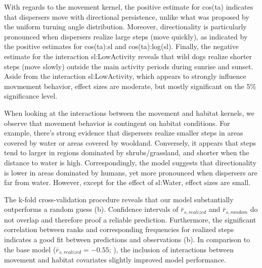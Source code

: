 \documentclass[abstract=on,10pt,a4paper,bibliography=totocnumbered]{article}
\begin{document}
With regards to the movement kernel, the positive estimate for \textsf{cos(ta)}
indicates that dispersers move with directional persistence, unlike what was
proposed by the uniform turning angle distribution. Moreover, directionality is
particularly pronounced when dispersers realize large steps (move quickly), as
indicated by the positive estimates for \textsf{cos(ta):sl} and
\textsf{cos(ta):log(sl)}. Finally, the negative estimate for the interaction
\textsf{sl:LowActivity} reveals that wild dogs realize shorter steps (move
slowly) outside the main activity periods during sunrise and sunset. Aside from
the interaction \textsf{sl:LowActivity}, which appears to strongly influence
movmement behavior, effect sizes are moderate, but mostly significant on the 5\%
significance level.

When looking at the interactions between the movement and habitat kernels, we
observe that movement behavior is contingent on habitat conditions. For example,
there's strong evidence that dispersers realize smaller steps in areas covered
by water or areas covered by wooldand. Conversely, it appears that steps tend to
larger in regions dominated by shrubs/grassland, and shorter when the distance
to water is high. Correspondingly, the model suggests that directionality is
lower in areas dominated by humans, yet more pronounced when dispersers are far
from water. However, except for the effect of \textsf{sl:Water}, effect sizes
are small.

The k-fold cross-validation procedure reveals that our model substantially
outperforms a random guess (b). Confidence intervals of
\(\bar{r}_{s, realized}\) and \(\bar{r}_{s, random}\) do not overlap and
therefore proof a reliable prediction. Furthermore, the significant correlation
between ranks and corresponding frequencies for realized steps indicates a good
fit between predictions and observations (b). In comparison
to the base model (\(\bar{r}_{s, realized} = -0.55\); \citealp{Hofmann.2021}),
the inclusion of interactions between movement and habitat covariates slightly
improved model performance.
\end{document}
